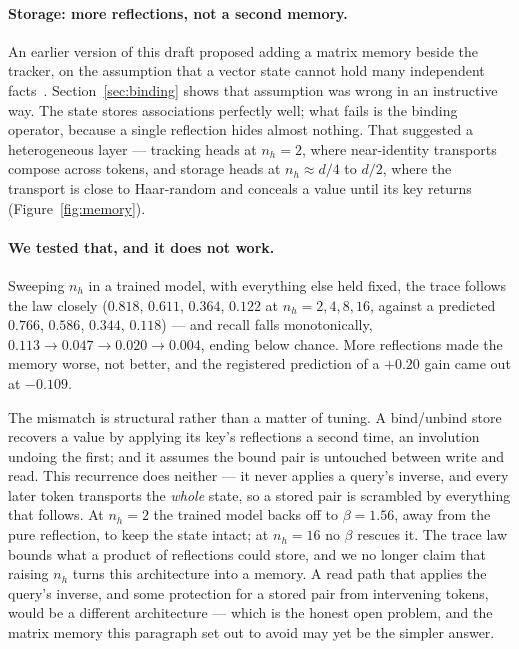 \documentclass[10pt]{article}
\begin{document}
\paragraph{Storage: more reflections, not a second memory.} An earlier version of this draft proposed
adding a matrix memory beside the tracker, on the assumption that a vector state cannot hold many
independent facts~\cite{arora2023zoology}. Section~\ref{sec:binding} shows that assumption was wrong
in an instructive way. The state stores associations perfectly well; what fails is the binding
operator, because a single reflection hides almost nothing. That suggested a heterogeneous layer ---
tracking heads at $n_h=2$, where near-identity transports compose across tokens, and storage heads at
$n_h\approx d/4$ to $d/2$, where the transport is close to Haar-random and conceals a value until its
key returns (Figure~\ref{fig:memory}).

\paragraph{We tested that, and it does not work.} Sweeping $n_h$ in a trained model, with everything
else held fixed, the trace follows the law closely ($0.818$, $0.611$, $0.364$, $0.122$ at
$n_h=2,4,8,16$, against a predicted $0.766$, $0.586$, $0.344$, $0.118$) --- and recall falls
monotonically, $0.113\to0.047\to0.020\to0.004$, ending below chance. More reflections made the memory
worse, not better, and the registered prediction of a $+0.20$ gain came out at $-0.109$.

The mismatch is structural rather than a matter of tuning. A bind/unbind store recovers a value by
applying its key's reflections a second time, an involution undoing the first; and it assumes the
bound pair is untouched between write and read. This recurrence does neither --- it never applies a
query's inverse, and every later token transports the \emph{whole} state, so a stored pair is
scrambled by everything that follows. At $n_h=2$ the trained model backs off to $\beta=1.56$, away
from the pure reflection, to keep the state intact; at $n_h=16$ no $\beta$ rescues it. The trace law
bounds what a product of reflections could store, and we no longer claim that raising $n_h$ turns
this architecture into a memory. A read path that applies the query's inverse, and some protection
for a stored pair from intervening tokens, would be a different architecture --- which is the honest
open problem, and the matrix memory this paragraph set out to avoid may yet be the simpler answer.
\end{document}
